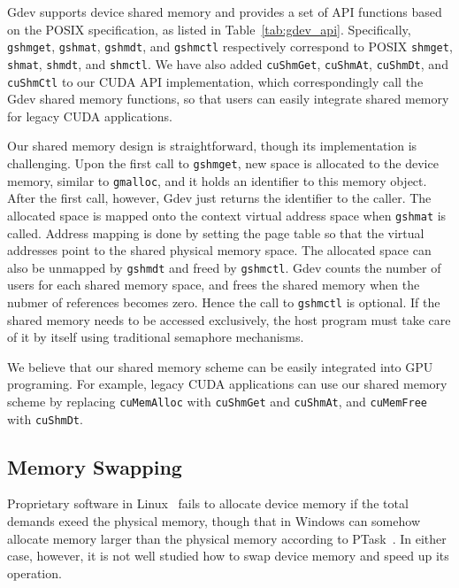 Gdev supports device shared memory and provides a set of API
functions based on the POSIX specification, as listed in
Table~\ref{tab:gdev_api}.
Specifically, \texttt{gshmget}, \texttt{gshmat}, \texttt{gshmdt}, and
\texttt{gshmctl} respectively correspond to POSIX \texttt{shmget},
\texttt{shmat}, \texttt{shmdt}, and \texttt{shmctl}. 
We have also added \texttt{cuShmGet}, \texttt{cuShmAt},
\texttt{cuShmDt}, and \texttt{cuShmCtl} to our CUDA API 
implementation, which correspondingly call the Gdev shared memory
functions, so that users can easily integrate shared memory for legacy
CUDA applications.

Our shared memory design is straightforward, though its implementation
is challenging.
Upon the first call to \texttt{gshmget}, new space is allocated to the
device memory, similar to \texttt{gmalloc}, and it holds an identifier
to this memory object. 
After the first call, however, Gdev just returns the identifier to the
caller.
The allocated space is mapped onto the context virtual address space
when \texttt{gshmat} is called.
Address mapping is done by setting the page table so that the virtual
addresses point to the shared physical memory space.
The allocated space can also be unmapped by \texttt{gshmdt} and freed by
\texttt{gshmctl}. 
Gdev counts the number of users for each shared memory space,
and frees the shared memory when the nubmer of references becomes zero.
Hence the call to \texttt{gshmctl} is optional.
If the shared memory needs to be accessed exclusively, the host program
must take care of it by itself using traditional semaphore mechanisms.

We believe that our shared memory scheme can be easily integrated into
GPU programing.
For example, legacy CUDA applications can use our shared memory scheme
by replacing \texttt{cuMemAlloc} with \texttt{cuShmGet} and
\texttt{cuShmAt}, and \texttt{cuMemFree} with \texttt{cuShmDt}.

\subsection{Memory Swapping}
\label{sec:memory_swapping}

Proprietary software in Linux~\cite{BLOB,CUDA40} fails to allocate
device memory if the total demands exeed the physical memory, though
that in Windows can somehow allocate memory larger than the physical
memory according to PTask~\cite{Rossbach_SOSP11}. 
In either case, however, it is not well studied how to swap device
memory and speed up its operation.

